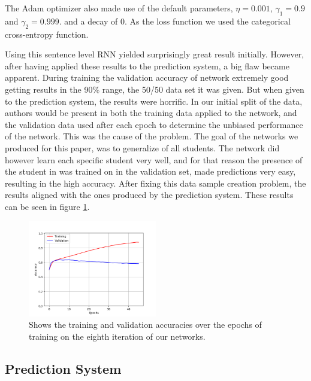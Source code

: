 The Adam optimizer also made use of the default parameters, $\eta = 0.001$,
$\gamma_1 = 0.9$ and $\gamma_2=0.999$. and a decay of 0. As the loss function we
used the categorical cross-entropy function.

Using this sentence level \gls{RNN} yielded surprisingly great result initially.
However, after having applied these results to the prediction system, a big
flaw became apparent. During training the validation accuracy of network
extremely good getting results in the 90\% range, the 50/50 data set it was
given. But when given to the prediction system, the results were horrific. In
our initial split of the data, authors would be present in both the training
data applied to the network, and the validation data used after each epoch to
determine the unbiased performance of the network. This was the cause of the
problem. The goal of the networks we produced for this paper, was to generalize
of all students. The network did however learn each specific student very
well, and for that reason the presence of the student in was trained on in the
validation set, made predictions very easy, resulting in the high accuracy.
After fixing this data sample creation problem, the results aligned with the
ones produced by the prediction system. These results can be seen in figure
\ref{fig:network_8_accuracies}.

\begin{figure}
    \centering
    \includegraphics[width=0.5\textwidth]{./pictures/experiments/network_8_accuracies.png}
    \caption{Shows the training and validation accuracies over the epochs of
        training on the eighth iteration of our networks.}
    \label{fig:network_8_accuracies}
\end{figure}


\subsection{Prediction System}


